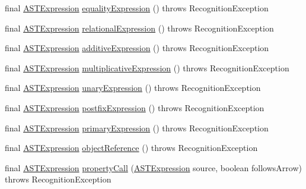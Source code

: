 \begin{DoxyCompactItemize}
\item 
final \hyperlink{classorg_1_1tzi_1_1use_1_1parser_1_1ocl_1_1_a_s_t_expression}{A\-S\-T\-Expression} \hyperlink{classorg_1_1tzi_1_1use_1_1parser_1_1shell_1_1_shell_command_parser_a8b340d31c4ce969bc6be749cf13e9194}{equality\-Expression} ()  throws Recognition\-Exception 
\item 
final \hyperlink{classorg_1_1tzi_1_1use_1_1parser_1_1ocl_1_1_a_s_t_expression}{A\-S\-T\-Expression} \hyperlink{classorg_1_1tzi_1_1use_1_1parser_1_1shell_1_1_shell_command_parser_a3c429ae64ab29af662e5d746bb9dd33f}{relational\-Expression} ()  throws Recognition\-Exception 
\item 
final \hyperlink{classorg_1_1tzi_1_1use_1_1parser_1_1ocl_1_1_a_s_t_expression}{A\-S\-T\-Expression} \hyperlink{classorg_1_1tzi_1_1use_1_1parser_1_1shell_1_1_shell_command_parser_acbf53c0a65aaf233bf295a6c5eaddf3a}{additive\-Expression} ()  throws Recognition\-Exception 
\item 
final \hyperlink{classorg_1_1tzi_1_1use_1_1parser_1_1ocl_1_1_a_s_t_expression}{A\-S\-T\-Expression} \hyperlink{classorg_1_1tzi_1_1use_1_1parser_1_1shell_1_1_shell_command_parser_a13eff21ed1765106cd4609cdeac3ec51}{multiplicative\-Expression} ()  throws Recognition\-Exception 
\item 
final \hyperlink{classorg_1_1tzi_1_1use_1_1parser_1_1ocl_1_1_a_s_t_expression}{A\-S\-T\-Expression} \hyperlink{classorg_1_1tzi_1_1use_1_1parser_1_1shell_1_1_shell_command_parser_ad3fc296be467e6518ef8f7e5ddee7c82}{unary\-Expression} ()  throws Recognition\-Exception 
\item 
final \hyperlink{classorg_1_1tzi_1_1use_1_1parser_1_1ocl_1_1_a_s_t_expression}{A\-S\-T\-Expression} \hyperlink{classorg_1_1tzi_1_1use_1_1parser_1_1shell_1_1_shell_command_parser_a34f280aeb423db7c3856696e8a79196f}{postfix\-Expression} ()  throws Recognition\-Exception 
\item 
final \hyperlink{classorg_1_1tzi_1_1use_1_1parser_1_1ocl_1_1_a_s_t_expression}{A\-S\-T\-Expression} \hyperlink{classorg_1_1tzi_1_1use_1_1parser_1_1shell_1_1_shell_command_parser_ac0e3def1193f24d9f8c92ec25b7ef4fd}{primary\-Expression} ()  throws Recognition\-Exception 
\item 
final \hyperlink{classorg_1_1tzi_1_1use_1_1parser_1_1ocl_1_1_a_s_t_expression}{A\-S\-T\-Expression} \hyperlink{classorg_1_1tzi_1_1use_1_1parser_1_1shell_1_1_shell_command_parser_acffa2f2d87c2eb52297a59545d6215b7}{object\-Reference} ()  throws Recognition\-Exception 
\item 
final \hyperlink{classorg_1_1tzi_1_1use_1_1parser_1_1ocl_1_1_a_s_t_expression}{A\-S\-T\-Expression} \hyperlink{classorg_1_1tzi_1_1use_1_1parser_1_1shell_1_1_shell_command_parser_a9154c0179ef1829c880b3b4f8170f663}{property\-Call} (\hyperlink{classorg_1_1tzi_1_1use_1_1parser_1_1ocl_1_1_a_s_t_expression}{A\-S\-T\-Expression} source, boolean follows\-Arrow)  throws Recognition\-Exception 

\end{DoxyCompactItemize}
